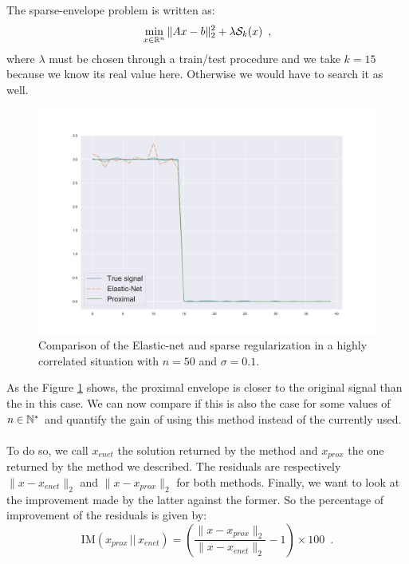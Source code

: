 
The sparse-envelope problem is written as:
\[\min_{x\in \mathbb{R}^n} \|Ax-b\|^2_2 + \lambda\mathcal{S}_k(x)\enspace,\]
where $\lambda$ must be chosen through a train/test procedure and we take $k=15$ because we know its real value here. Otherwise we would have to search it as well.

\begin{center}
    \begin{figure}[H]
        \centering
        \includegraphics[width=.9\linewidth]{images/enet_proxi.pdf}
        \caption{Comparison of the Elastic-net and sparse regularization in a highly correlated situation with $n=50$ and $\sigma=0.1$.}
        \label{fig:enet_sp}
    \end{figure}
\end{center}

As the Figure \ref{fig:enet_sp} shows, the proximal envelope is closer to the original signal than the \enet in this case.
We can now compare if this is also the case for some values of $n\in\mathbb{N}^*$ and quantify the gain of using this method instead of the \enet currently used.

\paragraph*{}
To do so, we call $x_{enet}$ the solution returned by the \enet method and $x_{prox}$ the one returned by the method we described. The residuals are respectively $\|x-x_{enet}\|_2$ and $\|x-x_{prox}\|_2$ for both methods. Finally, we want to look at the improvement made by the latter against the former. So the percentage of improvement of the residuals is given by:
\[\mathrm{IM}(x_{prox}\,||\,x_{enet})=\left(\frac{\|x-x_{prox}\|_2}{\|x-x_{enet}\|_2} - 1 \right) \times 100\enspace.\]

